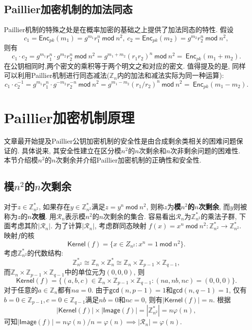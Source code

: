 \documentclass{article}
\newcommand{\Z}{\mathbb{Z}}
\begin{document}
\subsection{Paillier加密机制的加法同态}

Paillier机制的特殊之处是在概率加密的基础之上提供了加法同态的特性. 
假设
$$
c_1 = \textsf{Enc}_{pk}(m_1)  = g^{m_1}r_1^{n}~\textsf{mod}~n^2, \ 
c_2 = \textsf{Enc}_{pk}(m_2)  = g^{m_2}r_2^{n}~\textsf{mod}~n^2,
$$
则有
$$
c_1 \cdot c_2 =  g^{m_1}r_1^{n}\cdot g^{m_2}r_2^{n}~\textsf{mod}~n^2 =
g^{m_1 + m_2} (r_1r_2)^n ~\textsf{mod}~n^2 = ~\textsf{Enc}_{pk}(m_1+m_2).
$$
在公钥相同时,两个密文的乘积等于两个明文之和对应的密文.
值得提及的是, 同样可以利用Paillier机制进行同态减法($\Z_n$内的加法和减法实际为同一种运算):
$$
c_1 \cdot c_2^{-1} =  g^{m_1}r_1^{n}\cdot g^{-m_2}r_2^{-n}~\textsf{mod}~n^2 =
g^{m_1 - m_2} (r_1 / r_2)^n ~\textsf{mod}~n^2 = ~\textsf{Enc}_{pk}(m_1-m_2).
$$

\section{Paillier加密机制原理}

文章最开始提及Paillier公钥加密机制的安全性是由合成剩余类相关的困难问题保证的.
具体说来, 其安全性建立在区分模$n^2$的$n$次剩余和$n$次非剩余问题的困难性.
本节介绍模$n^2$的$n$次剩余并介绍Paillier加密机制的正确性和安全性.

\subsection{模$n^2$的$n$次剩余}

对于$z\in\Z_{n^2}^*$, 如果存在$y\in\Z_{n^2}^*$满足$z = y^n~\textsf{mod}~n^2$, 
则称$z$为\textbf{模$n^2$的$n$次剩余}, 而$y$则被称为$z$的\textbf{$n$次根}.
用$\mathcal{R}_n$表示模$n^2$的$n$次剩余的集合. 
容易看出$\mathcal{R}_n$为$\Z_{n^2}^*$的乘法子群, 下面考虑其阶$|\mathcal{R}_n|$.
为了计算$|\mathcal{R}_n|$, 考虑群同态映射
$f(x) = x^n~\textsf{mod}~n^2: \Z_{n^2}^*  \rightarrow \Z_{n^2}^*$. 
映射$f$的核
$$
\textsf{Kernel}(f) = \{x \in Z_{n^2}: x^n = 1~\textsf{mod}~n^2 \}.
$$
考虑$\Z_{n^2}^*$的代数结构:
$$
\Z_{n^2}^* \cong \Z_n \times \Z_n^* \cong \Z_n \times \Z_{p-1} \times \Z_{q-1},
$$
而$\Z_n \times \Z_{p-1} \times \Z_{q-1}$中的单位元为$(0,0,0)$, 
则
$$
\textsf{Kernel}(f) = \{ (a, b, c) \in \Z_n \times \Z_{p-1} \times \Z_{q-1}: (na, nb, nc) = (0,0,0)\}.
$$
对于任意的$a\in\Z_n$都有$na = 0$. 由于$\textsf{gcd}(n, p-1) = 1$和$\textsf{gcd}(n, q-1) = 1$, 
仅有$b = 0 \in \Z_{p-1}, c = 0 \in \Z_{q-1}$满足$nb = 0$和$nc = 0$, 
则有$|\textsf{Kernel}(f)| = n$. 根据
$$
|\textsf{Kernel}(f)| \times |\textsf{Image}(f)| = |\Z_{n^2}^*| = n\varphi(n), 
$$
可知$|\textsf{Image}(f)| = n\varphi(n) / n  = \varphi(n) \implies |\mathcal{R}_n| = \varphi(n)$.
\end{document}
